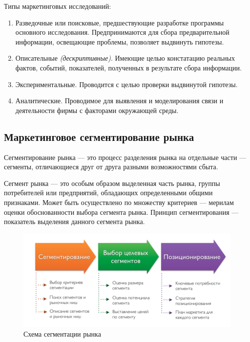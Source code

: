 \documentclass[a4paper,12pt,oneside,final]{extarticle}
\numberwithin{equation}{section}
\begin{document}
Типы маркетинговых исследований:
\begin{enumerate}
	\item Разведочные или поисковые, предшествующие разработке программы основного исследования. 
	Предпринимаются для сбора предварительной информации, освещающие проблемы, позволяет выдвинуть гипотезы.
	\item Описательные \textit{(дескриптивные)}. 
	Имеющие целью констатацию реальных фактов, событий, показателей, полученных в результате сбора информации. 
	\item Экспериментальные. 
	Проводится с целью проверки выдвинутой гипотезы.
	\item Аналитические. 
	Проводимое для выявления и моделирования связи и деятельности фирмы с факторами окружающей среды. 
\end{enumerate}

\subsection{Маркетинговое сегментирование рынка}
Сегментирование рынка --- это процесс разделения рынка на отдельные части --- сегменты, отличающиеся друг от друга разными возможностями сбыта.

Сегмент рынка --- это особым образом выделенная часть рынка, группы потребителей или предприятий, обладающих определенными общими признаками. 
Может быть осуществлено по множеству критериев --- мерилам оценки обоснованности выбора сегмента рынка. 
Принцип сегментирования --- показатель выделения данного сегмента рынка. 

\begin{figure}[h]
	\centering
	\includegraphics[width=\textwidth]{management-figures/marketing_segmentation_process}
	\caption{Схема сегментации рынка}
\end{figure}
\end{document}
